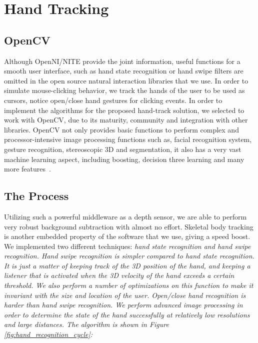 \chapter{Hand Tracking}
\label{appendix_hand_tracking}

\section{OpenCV}
 
Although OpenNI/NITE provide the joint information, useful functions for a smooth user interface, such as hand state recognition or hand swipe filters are omitted in the open source natural interaction libraries that we use. In order to simulate mouse-clicking behavior, we track the hands of the user to be used as cursors, notice open/close hand gestures for clicking events. In order to implement the algorithms for the proposed hand-track solution, we selected to work with OpenCV, due to its maturity, community and integration with other libraries. OpenCV not only provides basic functions to perform complex and processor-intensive image processing functions such as, facial recognition system, gesture recognition, stereoscopic 3D and segmentation, it also has a very vast machine learning aspect, including boosting, decision three learning and many more features~\cite{opencv_library}.

\section{The Process}

Utilizing such a powerful middleware as a depth sensor, we are able to perform very robust background subtraction with almost no effort. Skeletal body tracking is another embedded property of the software that we use, giving a speed boost. We implemented two different techniques: \em{hand state recognition} and \em{hand swipe recognition}. Hand swipe recognition is simpler compared to hand state recognition. It is just a matter of keeping track of the 3D position of the hand, and keeping a listener that is activated when the 3D velocity of the hand exceeds a certain threshold. We also perform a number of optimizations on this function to make it invariant with the size and location of the user. Open/close hand recognition is harder than hand swipe recognition. We perform advanced image processing in order to determine the state of the hand successfully at relatively low resolutions and large distances. The algorithm is shown in Figure \ref{fig:hand_recognition_cycle}:

